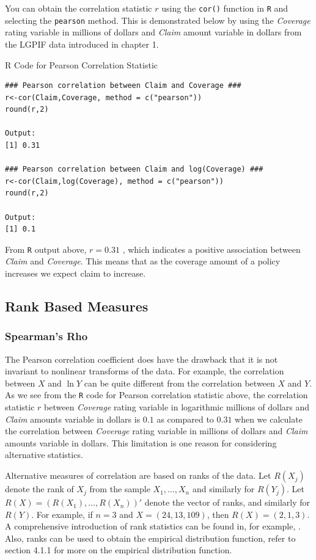 \documentclass[]{book}
\theoremstyle{definition}
\theoremstyle{definition}
\theoremstyle{definition}
\theoremstyle{remark}
\begin{document}
You can obtain the correlation statistic \(r\) using the \texttt{cor()}
function in \texttt{R} and selecting the \texttt{pearson} method. This
is demonstrated below by using the \emph{Coverage} rating variable in
millions of dollars and \emph{Claim} amount variable in dollars from the
LGPIF data introduced in chapter 1.

R Code for Pearson Correlation Statistic

\hypertarget{display.pearson.2}{}
\begin{verbatim}
### Pearson correlation between Claim and Coverage ###
r<-cor(Claim,Coverage, method = c("pearson"))
round(r,2)

Output:
[1] 0.31

### Pearson correlation between Claim and log(Coverage) ###
r<-cor(Claim,log(Coverage), method = c("pearson"))
round(r,2)

Output:
[1] 0.1
\end{verbatim}

From \texttt{R} output above, \(r=0.31\) , which indicates a positive
association between \emph{Claim} and \emph{Coverage}. This means that as
the coverage amount of a policy increases we expect claim to increase.

\subsection{Rank Based Measures}\label{rank-based-measures}

\subsubsection{Spearman's Rho}\label{spearmans-rho}

The Pearson correlation coefficient does have the drawback that it is
not invariant to nonlinear transforms of the data. For example, the
correlation between \(X\) and \(\ln Y\) can be quite different from the
correlation between \(X\) and \(Y\). As we see from the \texttt{R} code
for Pearson correlation statistic above, the correlation statistic \(r\)
between \emph{Coverage} rating variable in logarithmic millions of
dollars and \emph{Claim} amounts variable in dollars is \(0.1\) as
compared to \(0.31\) when we calculate the correlation between
\emph{Coverage} rating variable in millions of dollars and \emph{Claim}
amounts variable in dollars. This limitation is one reason for
considering alternative statistics.

Alternative measures of correlation are based on ranks of the data. Let
\(R(X_j)\) denote the rank of \(X_j\) from the sample
\(X_1, \ldots, X_n\) and similarly for \(R(Y_j)\). Let
\(R(X) = \left(R(X_1), \ldots, R(X_n)\right)'\) denote the vector of
ranks, and similarly for \(R(Y)\). For example, if \(n=3\) and
\(X=(24, 13, 109)\), then \(R(X)=(2,1,3)\). A comprehensive introduction
of rank statistics can be found in, for example,
\citep{hettmansperger1984statistical}. Also, ranks can be used to obtain
the empirical distribution function, refer to section 4.1.1 for more on
the empirical distribution function.
\end{document}
